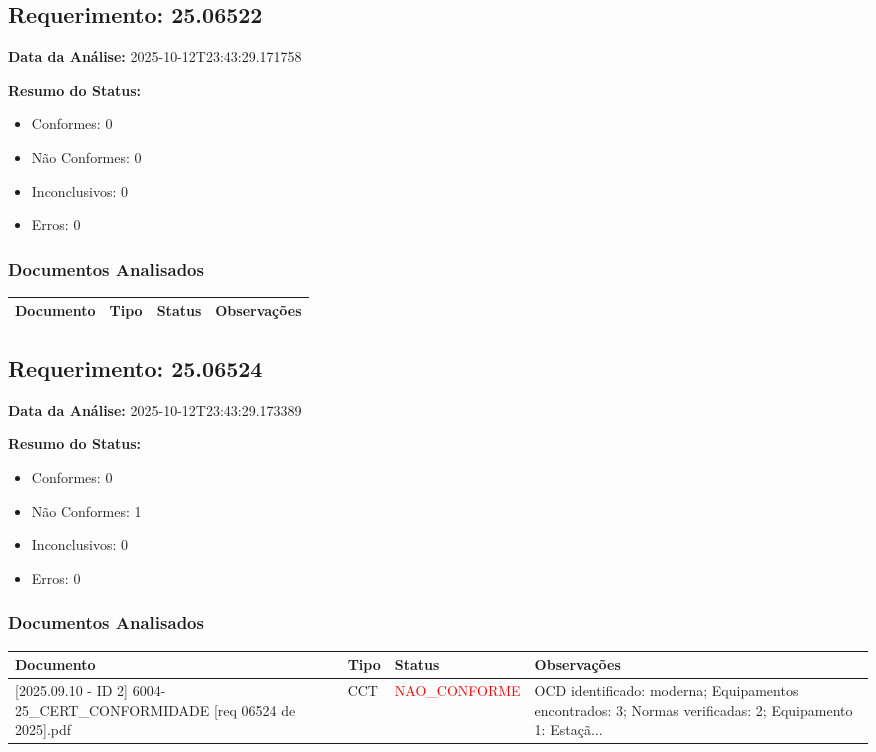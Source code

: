 \documentclass[12pt,a4paper]{article}
\begin{document}
\subsection{Requerimento: 25.06522}

\textbf{Data da Análise:} 2025-10-12T23:43:29.171758

\textbf{Resumo do Status:}
\begin{itemize}
    \item Conformes: 0
    \item Não Conformes: 0
    \item Inconclusivos: 0
    \item Erros: 0
\end{itemize}

\subsubsection{Documentos Analisados}

\begin{longtable}{|p{4cm}|p{2cm}|p{2cm}|p{6cm}|}
\hline
\textbf{Documento} & \textbf{Tipo} & \textbf{Status} & \textbf{Observações} \\
\hline
\endhead
\end{longtable}


\subsection{Requerimento: 25.06524}

\textbf{Data da Análise:} 2025-10-12T23:43:29.173389

\textbf{Resumo do Status:}
\begin{itemize}
    \item Conformes: 0
    \item Não Conformes: 1
    \item Inconclusivos: 0
    \item Erros: 0
\end{itemize}

\subsubsection{Documentos Analisados}

\begin{longtable}{|p{4cm}|p{2cm}|p{2cm}|p{6cm}|}
\hline
\textbf{Documento} & \textbf{Tipo} & \textbf{Status} & \textbf{Observações} \\
\hline
\endhead
[Certificado de Conformidade Técnica - CCT][2025.09.10 - ID 2] 6004-25\_CERT\_CONFORMIDADE [req 06524 de 2025].pdf & CCT & \textcolor{red}{NAO\_CONFORME} & OCD identificado: moderna; Equipamentos encontrados: 3; Normas verificadas: 2; Equipamento 1: Estaçã... \\
\hline
\end{longtable}
\end{document}
